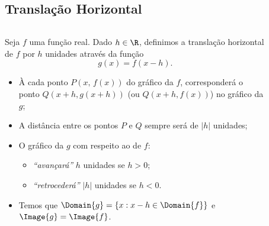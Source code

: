 \subsection{Translação Horizontal}
\begin{frame}
  \begin{columns}[onlytextwidth]
    \begin{column}{0.49\textwidth}\vspace*{-0.5cm}
      \begin{definition}
        Seja $f$ uma função real. Dado $h\in\R$, definimos a translação horizontal de $f$ por $h$ unidades através da função
        \begin{equation*}
          g(x) = f(x-h).
        \end{equation*}
      \end{definition}
      \vspace*{-0.2cm}
      \begin{itemize}
        \item À cada ponto $P(x,\,f(x))$ do gráfico da $f$, corresponderá o ponto $Q(x+h,g(x+h))$ (ou $Q(x+h,f(x))$) no gráfico da $g$;
        \item A distância entre os pontos $P$ e $Q$ sempre será de $|h|$ unidades;
        \item O gráfico da $g$ com respeito ao de $f$:
        \begin{itemize}
          \item \emph{``avançará''} $h$ unidades se $h>0$;
          \item<2> \emph{``retrocederá''} $|h|$ unidades se $h<0$.
        \end{itemize}
        \item Temos que $\Domain{g} = \{x:x-h\in\Domain{f}\}$ e $\Image{g}=\Image{f}$.
      \end{itemize}
    \end{column}
    \begin{column}{0.49\textwidth}
      \begin{figure}
      \end{figure}
    \end{column}
  \end{columns}
\end{frame}


